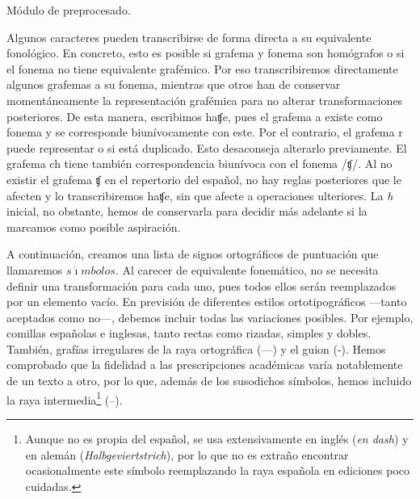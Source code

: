 \begin{algorithm}[!ht] %
	\caption{Módulo de preprocesado.}\label{list:preprocesado}
\end{algorithm}

Algunos caracteres pueden transcribirse de forma directa a su equivalente fonológico. En concreto, esto es posible si grafema y fonema son homógrafos o si el fonema no tiene equivalente grafémico. Por eso transcribiremos directamente algunos grafemas a su fonema, mientras que otros han de conservar momentáneamente la representación grafémica para no alterar transformaciones posteriores. De esta manera, escribimos \textlangle{}haʧe\textrangle{}, pues el grafema \textlangle{}a\textrangle{} existe como fonema y se corresponde biunívocamente con este. Por el contrario, el grafema \textlangle{}r\textrangle{} puede representar  o  si está duplicado. Esto desaconseja alterarlo previamente. El grafema \textlangle{}ch\textrangle{} tiene también correspondencia biunívoca con el fonema /ʧ/. Al no existir el grafema \textlangle{}ʧ\textrangle{} en el repertorio del español, no hay reglas posteriores que le afecten y lo transcribiremos \textlangle{}haʧe\textrangle{}, sin que afecte a operaciones ulteriores. La \textit{h} inicial, no obstante, hemos de conservarla para decidir más adelante si la marcamos como posible aspiración.

A continuación, creamos una lista de signos ortográficos de puntuación que llamaremos $s\acute{\imath}mbolos$. Al carecer de equivalente fonemático, no se necesita definir una transformación para cada uno, pues todos ellos serán reemplazados por un elemento vacío. En previsión de diferentes estilos ortotipográficos —tanto aceptados como no—, debemos incluir todas las variaciones posibles. Por ejemplo, comillas españolas e inglesas, tanto rectas como rizadas, simples y dobles. También, grafías irregulares de la raya ortográfica  (—) y el guion  (-). Hemos comprobado que la fidelidad a las prescripciones académicas \parencite[373]{rae2010} varía notablemente de un texto a otro, por lo que, además de los susodichos símbolos, hemos incluido la raya intermedia\footnote{Aunque no es propia del español, se usa extensivamente en inglés (\textit{en dash}) y en alemán (\textit{Halbgeviertstrich}), por lo que no es extraño encontrar ocasionalmente este símbolo reemplazando la raya española en ediciones poco cuidadas.} {(–)}.

